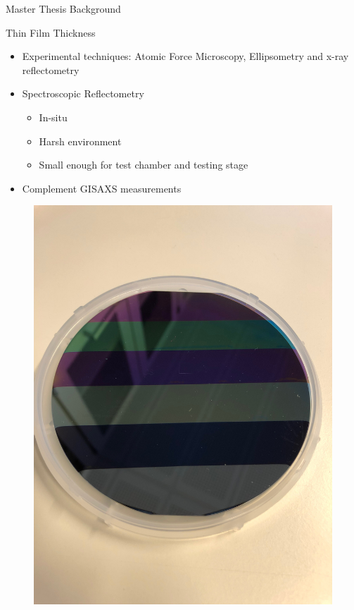 \documentclass[10pt]{beamer}
\begin{document}
\begin{frame}{Master Thesis Background}
\begin{figure}
\begin{minipage}{0.5\textwidth}
	\end{minipage}
	
\end{figure}

\end{frame}

	\begin{frame}{Thin Film Thickness}
	
	\begin{minipage}{0.47\textwidth}
	    \begin{itemize}
	    \item Experimental techniques: Atomic Force Microscopy, Ellipsometry and x-ray reflectometry
	    \item Spectroscopic Reflectometry
	    \begin{itemize}
	    \item In-situ
	    \item Harsh environment
	    \item Small enough for test chamber and testing stage
	    \end{itemize}
	    \item Complement GISAXS measurements 
	    \end{itemize}
	\end{minipage}
	\begin{minipage}{0.5\textwidth}
	    \begin{figure}
	    \includegraphics[scale=0.025,angle=-90]{stepwafer.JPG}
	    \end{figure}
	\end{minipage}
	

\end{frame}
\end{document}
